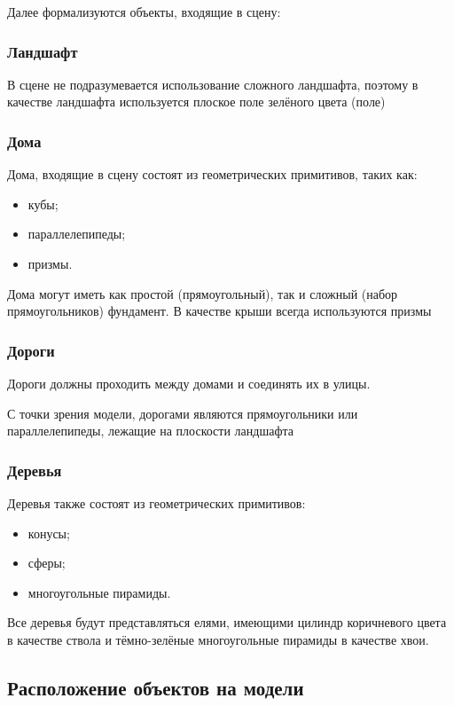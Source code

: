 Далее формализуются объекты, входящие в сцену:

\subsubsection*{Ландшафт}

В сцене не подразумевается использование сложного ландшафта, поэтому в качестве ландшафта используется плоское поле зелёного цвета (поле)

\subsubsection*{Дома}

Дома, входящие в сцену состоят из геометрических примитивов, таких как:
\begin{itemize}
    \item кубы;
    \item параллелепипеды;
    \item призмы.
\end{itemize}

Дома могут иметь как простой (прямоугольный), так и сложный (набор прямоугольников) фундамент. В качестве крыши всегда используются призмы 

\subsubsection*{Дороги}

Дороги должны проходить между домами и соединять их в улицы. 

С точки зрения модели, дорогами являются прямоугольники или параллелепипеды, лежащие на плоскости ландшафта

\subsubsection*{Деревья}

Деревья также состоят из геометрических примитивов:
\begin{itemize}
    \item конусы;
    \item сферы;
    \item многоугольные пирамиды.
\end{itemize}

Все деревья будут представляться елями, имеющими цилиндр коричневого цвета в качестве ствола и тёмно-зелёные многоугольные пирамиды в качестве хвои.

\subsection*{Расположение объектов на модели}

